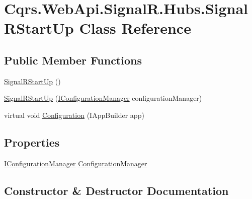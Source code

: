 \hypertarget{classCqrs_1_1WebApi_1_1SignalR_1_1Hubs_1_1SignalRStartUp}{}\section{Cqrs.\+Web\+Api.\+Signal\+R.\+Hubs.\+Signal\+R\+Start\+Up Class Reference}
\label{classCqrs_1_1WebApi_1_1SignalR_1_1Hubs_1_1SignalRStartUp}
\subsection*{Public Member Functions}
\begin{DoxyCompactItemize}
\item 
\hyperlink{classCqrs_1_1WebApi_1_1SignalR_1_1Hubs_1_1SignalRStartUp_a5d042d52b0c5671b7be52f69c05ec371_a5d042d52b0c5671b7be52f69c05ec371}{Signal\+R\+Start\+Up} ()
\item 
\hyperlink{classCqrs_1_1WebApi_1_1SignalR_1_1Hubs_1_1SignalRStartUp_a52cbff947cf5da34dd8487c60ab85321_a52cbff947cf5da34dd8487c60ab85321}{Signal\+R\+Start\+Up} (\hyperlink{interfaceCqrs_1_1Configuration_1_1IConfigurationManager}{I\+Configuration\+Manager} configuration\+Manager)
\item 
virtual void \hyperlink{classCqrs_1_1WebApi_1_1SignalR_1_1Hubs_1_1SignalRStartUp_a0d670a1f640c6fd19edda463fe708879_a0d670a1f640c6fd19edda463fe708879}{Configuration} (I\+App\+Builder app)
\end{DoxyCompactItemize}
\subsection*{Properties}
\begin{DoxyCompactItemize}
\item 
\hyperlink{interfaceCqrs_1_1Configuration_1_1IConfigurationManager}{I\+Configuration\+Manager} \hyperlink{classCqrs_1_1WebApi_1_1SignalR_1_1Hubs_1_1SignalRStartUp_a0c137e0c86431dc944d7a3415de011bb_a0c137e0c86431dc944d7a3415de011bb}{Configuration\+Manager}
\end{DoxyCompactItemize}


\subsection{Constructor \& Destructor Documentation}
\mbox{\label{classCqrs_1_1WebApi_1_1SignalR_1_1Hubs_1_1SignalRStartUp_a5d042d52b0c5671b7be52f69c05ec371_a5d042d52b0c5671b7be52f69c05ec371}} 
